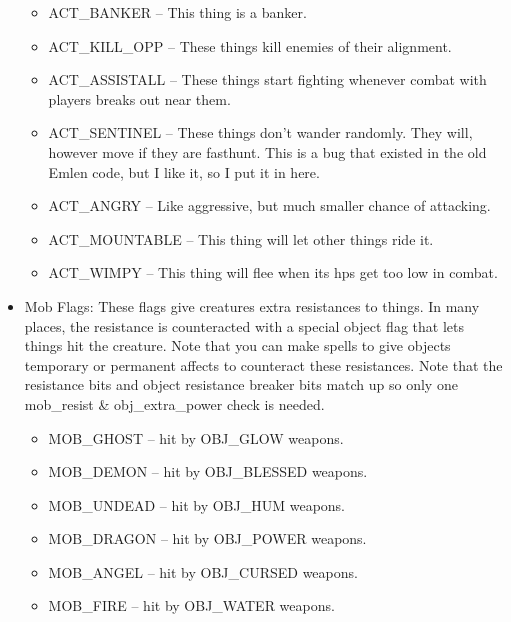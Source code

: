 \begin{itemize}
\begin{itemize}
\item ACT\_BANKER -- This thing is a banker.

\item ACT\_KILL\_OPP -- These things kill enemies of their alignment.

\item ACT\_ASSISTALL -- These things start fighting whenever combat
with players breaks out near them.

\item ACT\_SENTINEL -- These things don't wander randomly. They will,
however move if they are fasthunt. This is a bug that existed in the
old Emlen code, but I like it, so I put it in here.

\item ACT\_ANGRY -- Like aggressive, but much smaller chance of
attacking.

\item ACT\_MOUNTABLE -- This thing will let other things ride it.

\item ACT\_WIMPY -- This thing will flee when its hps get too low in combat.


\end{itemize}


\item Mob Flags: These flags give creatures extra resistances to
things. In many places, the resistance is counteracted with a special
object flag that lets things hit the creature. Note that you can make
spells to give objects temporary or permanent affects to counteract
these resistances. Note that the resistance bits and object resistance
breaker bits match up so only one mob\_resist \& obj\_extra\_power check
is needed.


\begin{itemize}

\item MOB\_GHOST -- hit by OBJ\_GLOW weapons.

\item MOB\_DEMON -- hit by OBJ\_BLESSED weapons.

\item MOB\_UNDEAD -- hit by OBJ\_HUM weapons.

\item MOB\_DRAGON -- hit by OBJ\_POWER weapons.

\item MOB\_ANGEL -- hit by OBJ\_CURSED weapons.

\item MOB\_FIRE -- hit by OBJ\_WATER weapons.


\end{itemize}
\end{itemize}
